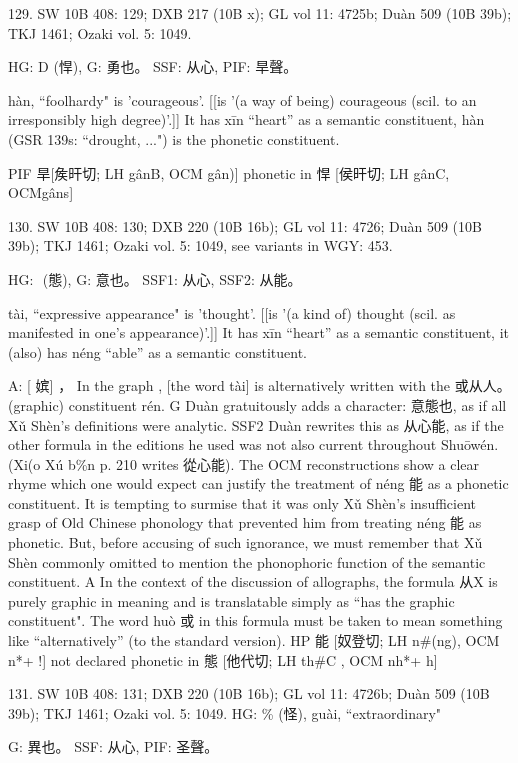 129. SW 10B 408: 129; DXB 217 (10B x); GL vol 11: 4725b; Duàn 509 (10B 39b); TKJ 1461; Ozaki vol. 5: 1049.

HG: D (悍),
G:	勇也。
SSF: 从心,
PIF: 旱聲。


hàn, ``foolhardy"
is 'courageous'. [[is '(a way of being) courageous (scil. to an irresponsibly high degree)'.]]
It has xīn ``heart'' as a semantic constituent,
hàn (GSR 139s: ``drought, ...") is the phonetic constituent.

PIF     旱[矦旰切; LH gânB, OCM gân)] phonetic in 悍 [侯旰切; LH gânC, OCMgâns]

130. SW 10B 408: 130; DXB 220 (10B 16b); GL vol 11: 4726; Duàn 509 (10B 39b); TKJ 1461; Ozaki vol. 5: 1049, see
variants in WGY: 453.

HG:   (態),
G:	意也。
SSF1: 从心,
SSF2: 从能。


tài, ``expressive appearance"
is 'thought'. [[is '(a kind of) thought (scil. as manifested in one's appearance)'.]]
It has xīn ``heart'' as a semantic constituent,
it (also) has néng ``able'' as a semantic constituent.



A:	[ 嫔] ， In the graph , [the word tài] is alternatively written with the
或从人。 (graphic) constituent rén.
G       Duàn gratuitously adds a character: 意態也, as if all Xǔ Shèn's definitions were analytic.
SSF2 Duàn rewrites this as 从心能, as if the other formula in the editions he used was not also current throughout Shuōwén. (Xi(o Xú b\%n p. 210 writes 從心能).
    The OCM reconstructions show a clear rhyme which one would expect can justify the treatment of néng 能 as a phonetic constituent. It is tempting to surmise that it was only Xǔ Shèn's insufficient grasp of Old Chinese phonology that prevented him from treating néng 能 as phonetic. But, before accusing of such ignorance, we must remember that Xǔ Shèn commonly omitted to mention the phonophoric function of the semantic constituent.
A	In the context of the discussion of allographs, the formula 从X is purely graphic in meaning and is translatable simply as ``has the graphic constituent".
The word huò 或 in this formula must be taken to mean something like ``alternatively'' (to the standard version).
HP	能 [奴登切; LH n\#(ng), OCM n*+ !] not declared phonetic in 態 [他代切; LH th\#C , OCM nh*+ h]

131. SW 10B 408: 131; DXB 220 (10B 16b); GL vol 11: 4726b; Duàn 509 (10B 39b); TKJ 1461; Ozaki vol. 5: 1049.
HG:  \% (怪), guài, ``extraordinary"

G:	異也。
SSF: 从心,
PIF: 圣聲。

